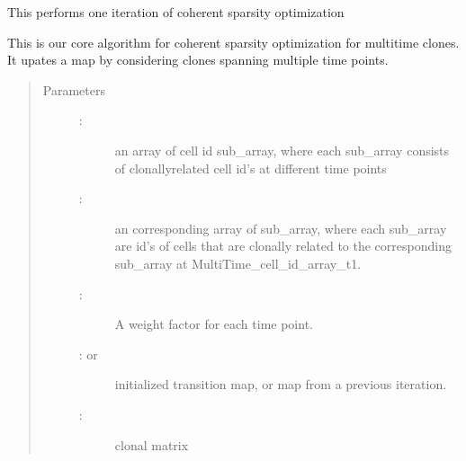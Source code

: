 \documentclass[letterpaper,10pt,english]{sphinxmanual}
\begin{document}
\begin{fulllineitems}
\label{\detokenize{cospar.tmap.refine_Tmap_through_cospar:cospar.tmap.refine_Tmap_through_cospar}}
This performs one iteration of coherent sparsity optimization

This is our core algorithm for coherent sparsity optimization for multi\sphinxhyphen{}time
clones. It upates a map by considering clones spanning multiple time points.
\begin{quote}\begin{description}
\item[{Parameters}] \leavevmode\begin{description}
\item[{ : }] \leavevmode
an array of cell id sub\_array, where each sub\_array consists of
clonally\sphinxhyphen{}related cell id’s at different time points

\item[{ : }] \leavevmode
an corresponding array of sub\_array, where each sub\_array are id’s of
cells that are clonally related to the corresponding sub\_array at
MultiTime\_cell\_id\_array\_t1.

\item[{ : }] \leavevmode
A weight factor for each time point.

\item[{ :  or }] \leavevmode
initialized transition map, or map from a previous iteration.

\item[{ : }] \leavevmode
clonal matrix


\end{description}
\end{description}
\end{quote}
\end{fulllineitems}
\end{document}
